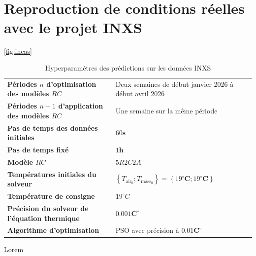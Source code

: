     \newpage

\section{Reproduction de conditions réelles avec le projet INXS}\label{sec:donnees-reelles-dans-le-cadre-du-projet-inxs}
    \ref{fig:incas}

    \begin{table}[H]
        \centering
        \caption{Hyperparamètres des prédictions sur les données INXS}
        \label{tab:hp_inxs}
        \begin{tabular}{ll}
            \toprule
            \textbf{Périodes $n$ d'optimisation des modèles $RC$} & Deux semaines de début janvier 2026 à début avril 2026\\
            \textbf{Périodes $n+1$ d'application des modèles $RC$} & Une semaine sur la même période\\
            \textbf{Pas de temps des données initiales} & $60\mathbf s$\\
            \textbf{Pas de temps fixé} & $1\mathbf h$\\
            \textbf{Modèle $RC$} & $5R2C2A$\\
            \textbf{Températures initiales du solveur} & $\left\{ T_{\text{air}_0}; T_{\text{mass}_0} \right\} = \left\{ 19^\circ\mathbf{C}; 19^\circ\mathbf{C} \right\}$ \\
            \textbf{Température de consigne} & $19^\circ C$\\
            \textbf{Précision du solveur de l'équation thermique} & $0.001\mathbf C^\circ$ \\
            \textbf{Algorithme d'optimisation} & PSO avec précision à $0.01\mathbf C^\circ$ \\
            \bottomrule
        \end{tabular}
    \end{table}

    Lorem

